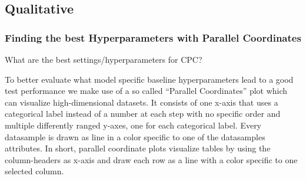 \subsection{Qualitative}
\subsubsection{Finding the best Hyperparameters with Parallel Coordinates}
What are the best settings/hyperparameters for CPC?

To better evaluate what model specific baseline hyperparameters lead to a good test performance we make use of a so called \enquote{Parallel Coordinates} plot which can visualize high-dimensional datasets. It consists of one x-axis that uses a categorical label instead of a number at each step with no specific order and multiple differently ranged y-axes, one for each categorical label. Every datasample is drawn as line in a color specific to one of the datasamples attributes. In short, parallel coordinate plots visualize tables by using the column-headers as x-axis and draw each row as a line with a color specific to one selected column.

